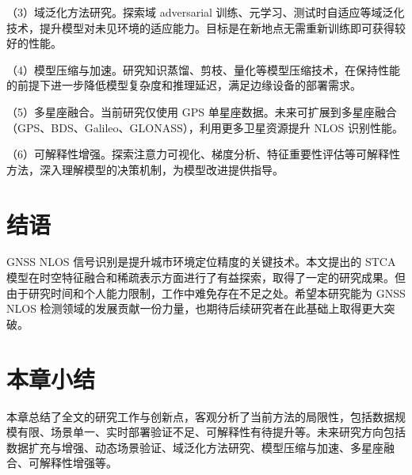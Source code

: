 （3）域泛化方法研究。探索域 adversarial 训练、元学习、测试时自适应等域泛化技术，提升模型对未见环境的适应能力。目标是在新地点无需重新训练即可获得较好的性能。

（4）模型压缩与加速。研究知识蒸馏、剪枝、量化等模型压缩技术，在保持性能的前提下进一步降低模型复杂度和推理延迟，满足边缘设备的部署需求。

（5）多星座融合。当前研究仅使用 GPS 单星座数据。未来可扩展到多星座融合（GPS、BDS、Galileo、GLONASS），利用更多卫星资源提升 NLOS 识别性能。

（6）可解释性增强。探索注意力可视化、梯度分析、特征重要性评估等可解释性方法，深入理解模型的决策机制，为模型改进提供指导。

\section{结语}

GNSS NLOS 信号识别是提升城市环境定位精度的关键技术。本文提出的 STCA 模型在时空特征融合和稀疏表示方面进行了有益探索，取得了一定的研究成果。但由于研究时间和个人能力限制，工作中难免存在不足之处。希望本研究能为 GNSS NLOS 检测领域的发展贡献一份力量，也期待后续研究者在此基础上取得更大突破。

\section{本章小结}

本章总结了全文的研究工作与创新点，客观分析了当前方法的局限性，包括数据规模有限、场景单一、实时部署验证不足、可解释性有待提升等。未来研究方向包括数据扩充与增强、动态场景验证、域泛化方法研究、模型压缩与加速、多星座融合、可解释性增强等。
